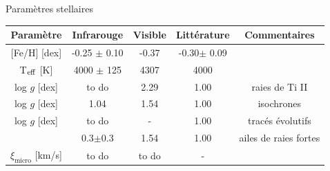 \documentclass[10pt]{beamer}
\begin{document}
\begin{frame}[fragile]{Paramètres stellaires}
    \begin{table}[h!]
        \begin{center}
            \renewcommand{\arraystretch}{1.5}
            \begin{tabular}{c|ccc|c}
                Paramètre & Infrarouge &Visible& Littérature &Commentaires\\
                \hline
                
                $[$Fe/H$]$ [dex]& -0.25 $\pm$ 0.10 & -0.37 &
                -0.30$\pm$ 0.09&\\
                T$_{\rm eff}$ [K] & 4000 $\pm$ 125 &4307 & 4000& \\
    
                log $g$ [dex]& to do & 2.29 & 1.00&raies de Ti II\\
                log $g$ [dex]& 1.04 & 1.54 & 1.00 &isochrones\\
                  
                log $g$ [dex]& to do & - & 1.00 &tracés évolutifs\\
                \arrayrulecolor{red}\hline
                \multicolumn{1}{|c}{log $g$ [dex]}& 0.3$\pm$0.3 & 1.54 & 1.00 &\multicolumn{1}{c|}{ailes de raies fortes}\\
                \arrayrulecolor{red}\hline
                $\xi_{\text{micro}}$ [km/s]& to do & to do & - &\\
            \end{tabular}
        \end{center}
    \end{table}
    \end{frame}
\end{document}

